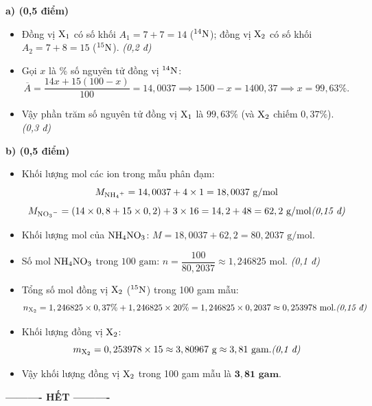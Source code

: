 \documentclass[11pt,a4paper]{article}
\begin{document}
\begin{tcolorbox}[colback=white,colframe=solBlue,title=\textbf{Lời giải chi tiết và Biểu điểm Câu 2:}]
\textbf{a) (0,5 điểm)}
\begin{itemize}[leftmargin=1.2cm]
\item Đồng vị $\ce{X_1}$ có số khối $A_1 = 7 + 7 = 14$ ($^{14}\ce{N}$); đồng vị $\ce{X_2}$ có số khối $A_2 = 7 + 8 = 15$ ($^{15}\ce{N}$). \hfill \textit{(0,2 đ)}
\item Gọi $x$ là \% số nguyên tử đồng vị $^{14}\ce{N}$:
$$\overline{A} = \dfrac{14x + 15(100 - x)}{100} = 14,0037 \implies 1500 - x = 1400,37 \implies x = 99,63\%.$$
\item Vậy phần trăm số nguyên tử đồng vị $\ce{X_1}$ là $99,63\%$ (và $\ce{X_2}$ chiếm $0,37\%$). \hfill \textit{(0,3 đ)}
\end{itemize}
\textbf{b) (0,5 điểm)}
\begin{itemize}[leftmargin=1.2cm]
\item Khối lượng mol các ion trong mẫu phân đạm:
$$M_{\ce{NH4^+}} = 14,0037 + 4 \times 1 = 18,0037\text{ g/mol}$$
$$M_{\ce{NO3^-}} = (14 \times 0,8 + 15 \times 0,2) + 3 \times 16 = 14,2 + 48 = 62,2\text{ g/mol} \hfill \textit{(0,15 đ)}$$
\item Khối lượng mol của $\ce{NH4NO3}$: $M = 18,0037 + 62,2 = 80,2037\text{ g/mol}$.
\item Số mol $\ce{NH4NO3}$ trong $100\text{ gam}$: $n = \dfrac{100}{80,2037} \approx 1,246825\text{ mol}$. \hfill \textit{(0,1 đ)}
\item Tổng số mol đồng vị $\ce{X_2}$ ($^{15}\ce{N}$) trong 100 gam mẫu:
$$n_{\ce{X_2}} = 1,246825 \times 0,37\% + 1,246825 \times 20\% = 1,246825 \times 0,2037 \approx 0,253978\text{ mol}. \hfill \textit{(0,15 đ)}$$
\item Khối lượng đồng vị $\ce{X_2}$:
$$m_{\ce{X_2}} = 0,253978 \times 15 \approx 3,80967\text{ g} \approx 3,81\text{ gam}. \hfill \textit{(0,1 đ)}$$
\item Vậy khối lượng đồng vị $\ce{X_2}$ trong 100 gam mẫu là $\mathbf{3,81\text{ gam}}$.
\end{itemize}
\end{tcolorbox}

\vspace{6pt}
\begin{center}
\textbf{\large ---------- HẾT ----------}
\end{center}
\end{document}
